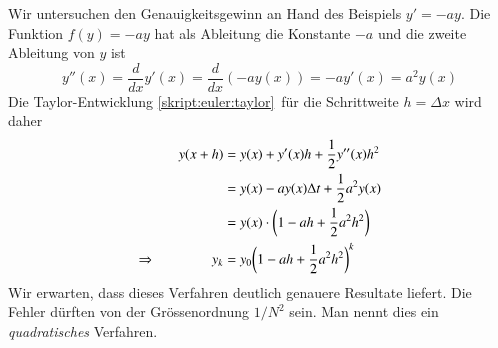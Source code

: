 Wir untersuchen den Genauigkeitsgewinn an Hand des Beispiels $y'=-ay$.
Die Funktion $f(y) = -ay$ hat als Ableitung die Konstante $-a$ und
die zweite Ableitung von $y$ ist
\[
y''(x) = \frac{d}{dx} y'(x) = \frac{d}{dx} (-ay(x)) = -ay'(x)=a^2 y(x)
\]
Die Taylor-Entwicklung \eqref{skript:euler:taylor} für die Schrittweite
$h=\Delta x$ wird daher
\begin{align}
y(x+h)
&=
y(x) + y'(x)h + \frac12y''(x)h^2
\notag
\\
&= y(x) - ay(x)\Delta t + \frac12 a^2 y(x)
\notag
\\
&= y(x)\cdot \biggl(1-ah+\frac12 a^2h^2\biggr)
\notag
\\
\Rightarrow\qquad\qquad
y_k&=y_0\biggl(1-ah+\frac12 a^2h^2\biggr)^k
\label{skript:euler:beschleunigt}
\end{align}
Wir erwarten, dass dieses Verfahren deutlich genauere Resultate liefert.
Die Fehler dürften von der Grössenordnung $1/N^2$ sein.
Man nennt dies ein {\em quadratisches} Verfahren.

